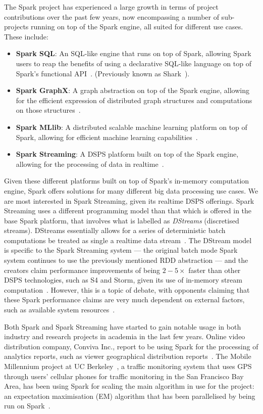 The Spark project has experienced a large growth in terms of project contributions over the past few years, now
encompassing a number of sub-projects running on top of the Spark engine, all suited for different use cases. These
include:

\begin{itemize}
  \item \textbf{Spark SQL}: An SQL-like engine that runs on top of Spark,
  allowing Spark users to reap the benefits of using a declarative SQL-like language on top of Spark's functional
  API~\cite{armbrustspark}. (Previously known as Shark~\cite{xin2013shark}).
  \item \textbf{Spark GraphX}: A graph abstraction on top of the Spark engine, allowing for the efficient expression of
  distributed graph structures and computations on those structures~\cite{xin2013graphx}.
  \item \textbf{Spark MLlib}: A distributed scalable machine learning platform on top of Spark, allowing for efficient
  machine learning capabilities~\cite{sparks2013mli}.
  \item \textbf{Spark Streaming}: A DSPS platform built on top of the Spark engine, allowing for the processing of data
  in realtime~\cite{zaharia2012discretized}.
\end{itemize}

Given these different platforms built on top of Spark's in-memory computation engine, Spark offers solutions for many
different big data processing use cases. We are most interested in Spark Streaming, given its realtime DSPS offerings.
Spark Streaming uses a different programming model than that which is offered in the base Spark platform, that involves what
is labelled as \textit{DStreams} (discretised streams). DStreams essentially allows for a series of deterministic batch computations
be treated as single a realtime data stream~\cite{zaharia2012discretized}. The DStream model is specific to the Spark Streaming
system --- the original batch mode Spark system continues to use the previously mentioned RDD abstraction --- and the
creators claim performance improvements of being $2-5\times$ faster than other DSPS technologies, such as S4
and Storm, given its use of in-memory stream computation~\cite{zaharia2013discretized}. However, this is a topic of debate,
with opponents claiming that these Spark performance claims are very much dependent on external factors, such as
available system resources~\cite{web_slideshare_b}.

Both Spark and Spark Streaming have started to gain notable usage in both industry and research projects in academia in
the last few years. Online video distribution company, Conviva Inc., report to be using Spark for the processing of
analytics reports, such as viewer geographical distribution reports~\cite{web_spark_conviva,zaharia2012fast}. The Mobile
Millennium project at UC Berkeley~\cite{web_spark_mmp}, a traffic monitoring system that uses GPS through users'
cellular phones for traffic monitoring in the San Francisco Bay Area, has been using Spark for scaling the main
algorithm in use for the project: an expectation maximisation (EM) algorithm that has been parallelised by being run on
Spark~\cite{hunter2011scaling}.

